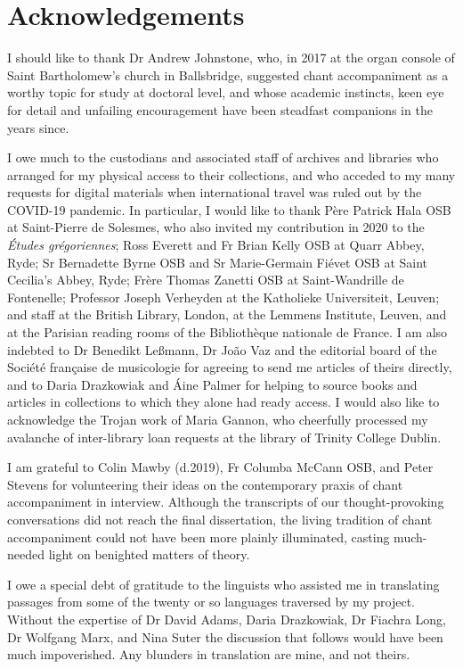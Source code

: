 \chapter{Acknowledgements}
I should like to thank Dr Andrew Johnstone, who, in 2017 at the organ console of Saint Bartholomew's church in Ballsbridge, suggested chant accompaniment as a worthy topic for study at doctoral level, and whose academic instincts, keen eye for detail and unfailing encouragement have been steadfast companions in the years since.

I owe much to the custodians and associated staff of archives and libraries who arranged for my physical access to their collections, and who acceded to my many requests for digital materials when international travel was ruled out by the COVID-19 pandemic. In particular, I would like to thank Père Patrick Hala OSB at Saint-Pierre de Solesmes, who also invited my contribution in 2020 to the \emph{Études grégoriennes}; Ross Everett and Fr Brian Kelly OSB at Quarr Abbey, Ryde; Sr Bernadette Byrne OSB and Sr Marie-Germain Fiévet OSB at Saint Cecilia's Abbey, Ryde; Frère Thomas Zanetti OSB at Saint-Wandrille de Fontenelle; Professor Joseph Verheyden at the Katholieke Universiteit, Leuven; and staff at the British Library, London, at the Lemmens Institute, Leuven, and at the Parisian reading rooms of the Bibliothèque nationale de France. I am also indebted to Dr Benedikt Leßmann, Dr João Vaz and the editorial board of the Société française de musicologie for agreeing to send me articles of theirs directly, and to Daria Drazkowiak and Áine Palmer for helping to source books and articles in collections to which they alone had ready access. I would also like to acknowledge the Trojan work of Maria Gannon, who cheerfully processed my avalanche of inter-library loan requests at the library of Trinity College Dublin.

I am grateful to Colin Mawby (d.2019), Fr Columba McCann OSB, and Peter Stevens for volunteering their ideas on the contemporary praxis of chant accompaniment in \linebreak{}interview. Although the transcripts of our thought-provoking conversations did not reach the final dissertation, the living tradition of chant accompaniment could not have been more plainly illuminated, casting much-needed light on benighted matters of theory.

I owe a special debt of gratitude to the linguists who assisted me in translating passages from some of the twenty or so languages traversed by my project. Without the expertise of Dr David Adams, Daria Drazkowiak, Dr Fiachra Long, Dr Wolfgang Marx, and Nina Suter the discussion that follows would have been much impoverished. Any blunders in translation are mine, and not theirs.

